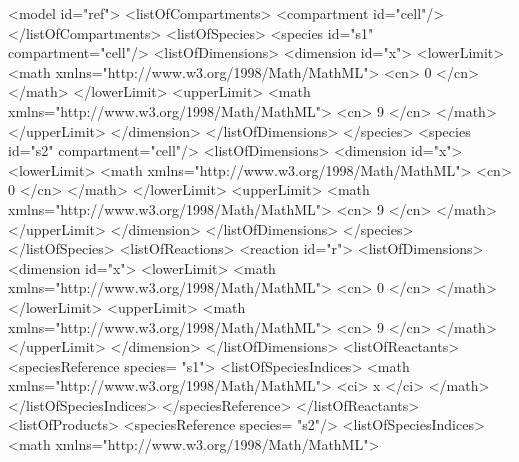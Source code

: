 \documentclass{cekarticle}
\begin{document}
\begin{example}
<model id="ref">
    <listOfCompartments>
        <compartment id="cell"/>
    </listOfCompartments>
    <listOfSpecies>
        <species id="s1" compartment="cell"/>
            <listOfDimensions>
                <dimension id="x">
                    <lowerLimit>
                        <math xmlns="http://www.w3.org/1998/Math/MathML">
                            <cn> 0 </cn>
                        </math>
                    </lowerLimit>
                    <upperLimit>
                        <math xmlns="http://www.w3.org/1998/Math/MathML">
                            <cn> 9 </cn>
                        </math>
                    </upperLimit>
                </dimension>
            </listOfDimensions>
        </species>
        <species id="s2" compartment="cell"/>
            <listOfDimensions>
                <dimension id="x">
                    <lowerLimit>
                        <math xmlns="http://www.w3.org/1998/Math/MathML">
                            <cn> 0 </cn>
                        </math>
                    </lowerLimit>
                    <upperLimit>
                        <math xmlns="http://www.w3.org/1998/Math/MathML">
                            <cn> 9 </cn>
                        </math>
                    </upperLimit>
                </dimension>
            </listOfDimensions>
        </species>
    </listOfSpecies>
    <listOfReactions>
        <reaction id="r">
            <listOfDimensions>
                <dimension id="x">
                    <lowerLimit>
                        <math xmlns="http://www.w3.org/1998/Math/MathML">
                            <cn> 0 </cn>
                        </math>
                    </lowerLimit>
                    <upperLimit>
                        <math xmlns="http://www.w3.org/1998/Math/MathML">
                            <cn> 9 </cn>
                        </math>
                    </upperLimit>
                </dimension>
            </listOfDimensions>
            <listOfReactants>
                <speciesReference species= "s1">
                    <listOfSpeciesIndices>
                        <math xmlns="http://www.w3.org/1998/Math/MathML">
                            <ci> x </ci>
                        </math>
                    </listOfSpeciesIndices>
                </speciesReference>
            </listOfReactants>
            <listOfProducts>
                <speciesReference species= "s2"/>
                    <listOfSpeciesIndices>
                        <math xmlns="http://www.w3.org/1998/Math/MathML">

\end{example}
\end{document}
